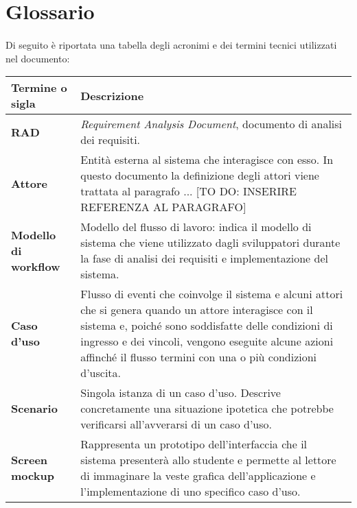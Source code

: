 \section{Glossario}

\paragraph{}
Di seguito è riportata una tabella degli acronimi e dei termini tecnici utilizzati nel documento:

\begin{table}
\begin{tabular}{p{1.5in}|p{4in}} \\
	{\bf Termine o sigla} & {\bf Descrizione} \\ \hline
	\textbf{RAD} & \textit{Requirement Analysis Document}, documento di analisi dei requisiti. \\
	\textbf{Attore} &  Entità esterna al sistema che interagisce con
	esso. In questo documento la definizione degli attori viene trattata al paragrafo ... [TO DO: INSERIRE REFERENZA AL PARAGRAFO] \\
	\textbf{Modello di workflow} & Modello del flusso di lavoro: indica il modello di sistema che viene utilizzato dagli sviluppatori durante la fase di analisi dei requisiti e implementazione del sistema. \\
	\textbf{Caso d'uso} & Flusso di eventi che coinvolge il sistema e alcuni attori che si genera quando  un attore interagisce con il sistema e, poiché sono soddisfatte delle condizioni di ingresso e dei vincoli, vengono eseguite alcune azioni affinché il flusso termini con una o più condizioni d’uscita. \\
	\textbf{Scenario} & Singola istanza di un caso d’uso. Descrive
	concretamente una situazione ipotetica che potrebbe verificarsi all'avverarsi di un caso d’uso. \\
	\textbf{Screen mockup} & Rappresenta un prototipo dell’interfaccia che il sistema presenterà allo studente e permette al lettore di immaginare la veste grafica dell’applicazione e l’implementazione di uno specifico caso d’uso. \\
\end{tabular}
\end{table}
\clearpage